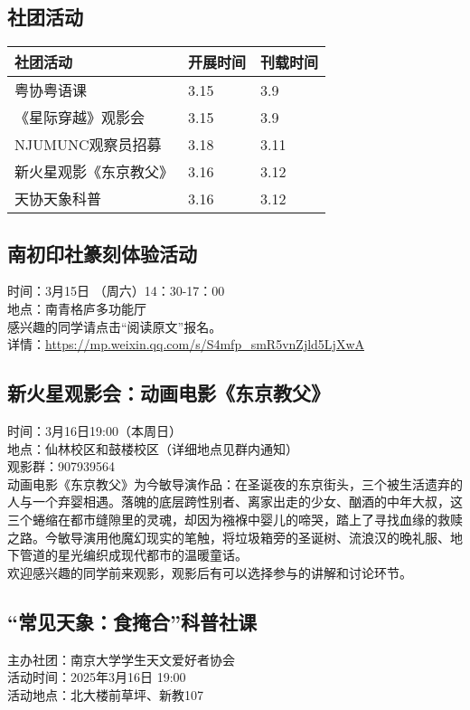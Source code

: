 \documentclass[letterpaper, 12pt]{article}
\begin{document}
\begin{multicols}{2}
\section{社团活动}
\begin{tabular}{|>{\centering\arraybackslash}m{}|m{}|m{}|}
    \hline
    社团活动 & 开展时间 & 刊载时间\\
    \hline\hline
    粤协粤语课 & 3.15 & 3.9\\
    《星际穿越》观影会 & 3.15 & 3.9\\
    NJUMUNC观察员招募 & 3.18 & 3.11\\
    新火星观影《东京教父》 & 3.16 & 3.12\\
    天协天象科普 & 3.16 & 3.12\\
    \hline
\end{tabular}
\subsection{南初印社篆刻体验活动}
时间：3月15日 （周六）14：30-17：00\\
地点：南青格庐多功能厅\\
感兴趣的同学请点击“阅读原文”报名。\\
详情：\url{https://mp.weixin.qq.com/s/S4mfp_smR5vnZjld5LjXwA}
\subsection{新火星观影会：动画电影《东京教父》}
时间：3月16日19:00（本周日）\\
地点：仙林校区和鼓楼校区（详细地点见群内通知）\\
观影群：907939564\\
动画电影《东京教父》为今敏导演作品：在圣诞夜的东京街头，三个被生活遗弃的人与一个弃婴相遇。落魄的底层跨性别者、离家出走的少女、酗酒的中年大叔，这三个蜷缩在都市缝隙里的灵魂，却因为襁褓中婴儿的啼哭，踏上了寻找血缘的救赎之路。今敏导演用他魔幻现实的笔触，将垃圾箱旁的圣诞树、流浪汉的晚礼服、地下管道的星光编织成现代都市的温暖童话。\\
欢迎感兴趣的同学前来观影，观影后有可以选择参与的讲解和讨论环节。\\

\subsection{“常见天象：食掩合”科普社课}
主办社团：南京大学学生天文爱好者协会\\
活动时间：2025年3月16日 19:00\\
活动地点：北大楼前草坪、新教107\\



\end{multicols}
\end{document}

